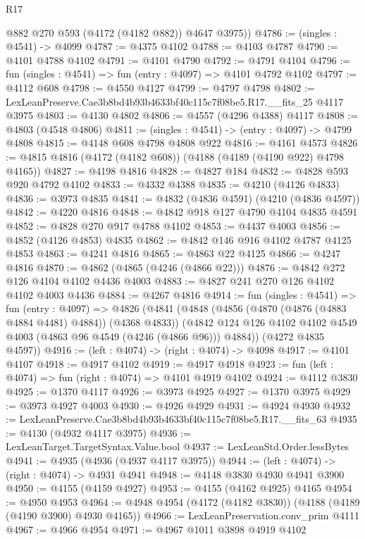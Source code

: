 \begin{lexlean}{R17}
\begin{coremodule}
        @882
        @270
        @593
        (@4172 (@4182 @882))
        @4647
        @3975))
@4786 := (singles : @4541) -> @4099
@4787 := @4375 @4102
@4788 := @4103 @4787
@4790 := @4101 @4788 @4102
@4791 := @4101 @4790
@4792 := @4791 @4104
@4796 := fun (singles : @4541) => fun (entry : @4097) => @4101 @4792 @4102
@4797 := @4112 @608
@4798 := @4550 @4127
@4799 := @4797 @4798
@4802 := LexLeanPreserve.Cae3b8bd4b93b4633bf40c115c7f08be5.R17.__fits_25 @4117 @3975
@4803 := @4130 @4802
@4806 := @4557 (@4296 @4388) @4117
@4808 := @4803 (@4548 @4806)
@4811 := (singles : @4541) -> (entry : @4097) -> @4799 @4808
@4815 := @4148 @608 @4798 @4808 @922
@4816 := @4161 @4573
@4826 := @4815 @4816 (@4172 (@4182 @608)) (@4188 (@4189 (@4190 @922) @4798 @4165))
@4827 := @4198 @4816
@4828 := @4827 @184
@4832 := @4828 @593 @920 @4792 @4102
@4833 := @4332 @4388
@4835 := @4210 (@4126 @4833)
@4836 := @3973 @4835
@4841 := @4832 (@4836 @4591) (@4210 (@4836 @4597))
@4842 := @4220 @4816
@4848 := @4842 @918 @127 @4790 @4104 @4835 @4591
@4852 := @4828 @270 @917 @4788 @4102
@4853 := @4437 @4003
@4856 := @4852 (@4126 @4853) @4835
@4862 := @4842 @146 @916 @4102 @4787 @4125 @4853
@4863 := @4241 @4816
@4865 := @4863 @22 @4125
@4866 := @4247 @4816
@4870 := @4862 (@4865 (@4246 (@4866 @22)))
@4876 := @4842 @272 @126 @4104 @4102 @4436 @4003
@4883 := @4827 @241 @270 @126 @4102 @4102 @4003 @4436
@4884 := @4267 @4816
@4914 := fun (singles : @4541) =>
  fun (entry : @4097) =>
  @4826
    (@4841
      (@4848
        (@4856 (@4870 (@4876 (@4883 @4884 @4481) @4884)) (@4368 @4833))
        (@4842 @124 @126 @4102 @4102 @4549 @4003 (@4863 @96 @4549 (@4246 (@4866 @96))) @4884))
      (@4272 @4835 @4597))
@4916 := (left : @4074) -> (right : @4074) -> @4098
@4917 := @4101 @4107
@4918 := @4917 @4102
@4919 := @4917 @4918
@4923 := fun (left : @4074) => fun (right : @4074) => @4101 @4919 @4102
@4924 := @4112 @3830
@4925 := @1370 @4117
@4926 := @3973 @4925
@4927 := @1370 @3975
@4929 := @3973 @4927 @4003
@4930 := @4926 @4929
@4931 := @4924 @4930
@4932 := LexLeanPreserve.Cae3b8bd4b93b4633bf40c115c7f08be5.R17.__fits_63
@4935 := @4130 (@4932 @4117 @3975)
@4936 := LexLeanTarget.TargetSyntax.Value.bool
@4937 := LexLeanStd.Order.lessBytes
@4941 := @4935 (@4936 (@4937 @4117 @3975))
@4944 := (left : @4074) -> (right : @4074) -> @4931 @4941
@4948 := @4148 @3830 @4930 @4941 @3900
@4950 := @4155 (@4159 @4927)
@4953 := @4155 (@4162 @4925) @4165
@4954 := @4950 @4953
@4964 := @4948 @4954 (@4172 (@4182 @3830)) (@4188 (@4189 (@4190 @3900) @4930 @4165))
@4966 := LexLeanPreservation.conv_prim @4111
@4967 := @4966 @4954
@4971 := @4967 @1011 @3898 @4919 @4102

\end{coremodule}
\end{lexlean}
